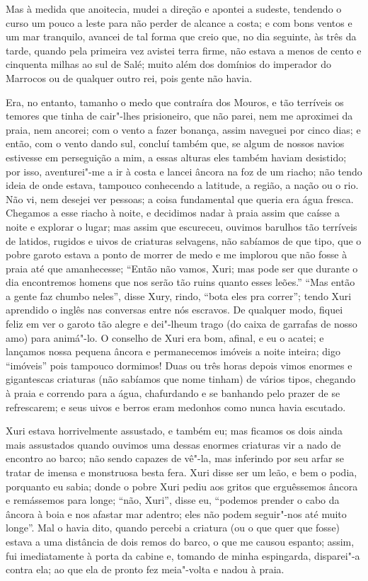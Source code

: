 Mas à medida que anoitecia, mudei a direção e apontei a sudeste,
tendendo o curso um pouco a leste para não perder de alcance a costa; e
com bons ventos e um mar tranquilo, avancei de tal forma que creio que,
no dia seguinte, às três da tarde, quando pela primeira vez avistei
terra firme, não estava a menos de cento e cinquenta milhas ao sul de
Salé; muito além dos domínios do imperador do Marrocos ou de qualquer
outro rei, pois gente não havia.

Era, no entanto, tamanho o medo que contraíra dos Mouros, e tão
terríveis os temores que tinha de cair"-lhes prisioneiro, que não parei,
nem me aproximei da praia, nem ancorei; com o vento a fazer bonança,
assim naveguei por cinco dias; e então, com o vento dando sul, concluí
também que, se algum de nossos navios estivesse em perseguição a mim, a
essas alturas eles também haviam desistido; por isso, aventurei"-me a ir
à costa e lancei âncora na foz de um riacho; não tendo ideia de onde
estava, tampouco conhecendo a latitude, a região, a nação ou o rio. Não
vi, nem desejei ver pessoas; a coisa fundamental que queria era água
fresca. Chegamos a esse riacho à noite, e decidimos nadar à praia assim
que caísse a noite e explorar o lugar; mas assim que escureceu, ouvimos
barulhos tão terríveis de latidos, rugidos e uivos de criaturas
selvagens, não sabíamos de que tipo, que o pobre garoto estava a ponto
de morrer de medo e me implorou que não fosse à praia até que
amanhecesse; ``Então não vamos, Xuri; mas pode ser que durante o dia
encontremos homens que nos serão tão ruins quanto esses leões.'' ``Mas
então a gente faz chumbo neles'', disse Xury, rindo, ``bota eles pra
correr''; tendo Xuri aprendido o inglês nas conversas entre nós
escravos. De qualquer modo, fiquei feliz em ver o garoto tão alegre e
dei"-lheum trago (do caixa de garrafas de nosso amo) para animá"-lo. O
conselho de Xuri era bom, afinal, e eu o acatei; e lançamos nossa
pequena âncora e permanecemos imóveis a noite inteira; digo ``imóveis''
pois tampouco dormimos! Duas ou três horas depois vimos enormes e
gigantescas criaturas (não sabíamos que nome tinham) de vários tipos,
chegando à praia e correndo para a água, chafurdando e se banhando pelo
prazer de se refrescarem; e seus uivos e berros eram medonhos como nunca
havia escutado.

Xuri estava horrivelmente assustado, e também eu; mas ficamos os dois
ainda mais assustados quando ouvimos uma dessas enormes criaturas vir a
nado de encontro ao barco; não sendo capazes de vê"-la, mas inferindo por
seu arfar se tratar de imensa e monstruosa besta fera. Xuri disse ser um
leão, e bem o podia, porquanto eu sabia; donde o pobre Xuri pediu aos
gritos que erguêssemos âncora e remássemos para longe; ``não, Xuri'',
disse eu, ``podemos prender o cabo da âncora à boia e nos afastar mar
adentro; eles não podem seguir"-nos até muito longe''. Mal o havia dito,
quando percebi a criatura (ou o que quer que fosse) estava a uma
distância de dois remos do barco, o que me causou espanto; assim, fui
imediatamente à porta da cabine e, tomando de minha espingarda,
disparei"-a contra ela; ao que ela de pronto fez meia"-volta e nadou à
praia.

